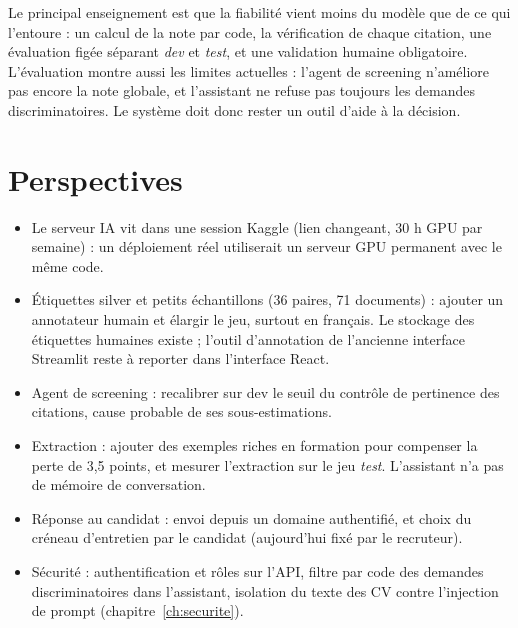 \documentclass[11pt,a4paper]{report}
\begin{document}
Le principal enseignement est que la fiabilité vient moins du modèle que de ce qui l'entoure : un calcul de la note par code, la vérification de chaque citation, une évaluation figée séparant \emph{dev} et \emph{test}, et une validation humaine obligatoire. L'évaluation montre aussi les limites actuelles : l'agent de screening n'améliore pas encore la note globale, et l'assistant ne refuse pas toujours les demandes discriminatoires. Le système doit donc rester un outil d'aide à la décision.

\chapter*{Perspectives}

\begin{itemize}
\item Le serveur IA vit dans une session Kaggle (lien changeant, 30 h GPU par semaine) : un déploiement réel utiliserait un serveur GPU permanent avec le même code.
\item Étiquettes silver et petits échantillons (36 paires, 71 documents) : ajouter un annotateur humain et élargir le jeu, surtout en français. Le stockage des étiquettes humaines existe ; l'outil d'annotation de l'ancienne interface Streamlit reste à reporter dans l'interface React.
\item Agent de screening : recalibrer sur dev le seuil du contrôle de pertinence des citations, cause probable de ses sous-estimations.
\item Extraction : ajouter des exemples riches en formation pour compenser la perte de 3,5 points, et mesurer l'extraction sur le jeu \emph{test}. L'assistant n'a pas de mémoire de conversation.
\item Réponse au candidat : envoi depuis un domaine authentifié, et choix du créneau d'entretien par le candidat (aujourd'hui fixé par le recruteur).
\item Sécurité : authentification et rôles sur l'API, filtre par code des demandes discriminatoires dans l'assistant, isolation du texte des CV contre l'injection de prompt (chapitre~\ref{ch:securite}).
\end{itemize}
\end{document}
